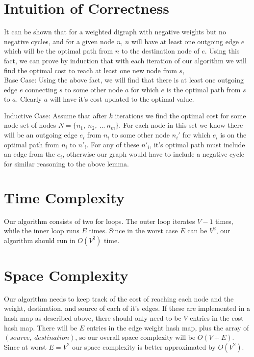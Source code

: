 \documentclass{article}
\begin{document}
\section{Intuition of Correctness}

It can be shown that for a weighted digraph with negative weights but no negative cycles, and for a given node $n$, $n$ will have at least one outgoing edge $e$ which will be the optimal path from $n$ to the destination node of $e$. Using this fact, we can prove by induction that with each iteration of our algorithm we will find the optimal cost to reach at least one new node from $s$, \\

Base Case: Using the above fact, we will find that there is at least one outgoing edge $e$ connecting $s$ to some other node $a$ for which $e$ is the optimal path from $s$ to $a$. Clearly $a$ will have it's cost updated to the optimal value.

Inductive Case: Assume that after $k$ iterations we find the optimal cost for some node set of nodes $N = \{n_1,\ n_2,\ ...\ n_m\}$. For each node in this set we know there will be an outgoing edge $e_i$ from $n_i$ to some other node $n_i'$ for which $e_i$ is on the optimal path from $n_i$ to $n'_i$. For any of these $n'_i$, it's optimal path must include an edge from the $e_i$, otherwise our graph would have to include a negative cycle for similar reasoning to the above lemma.

\section{Time Complexity}
Our algorithm consists of two for loops. The outer loop iterates $V-1$ times, while the inner loop runs $E$ times. Since in the worst case $E$ can be $V^2$, our algorithm should run in $O(V^3)$ time.

\section{Space Complexity}
Our algorithm needs to keep track of the cost of reaching each node and the weight, destination, and source of each of it's edges. If these are implemented in a hash map as described above, there should only need to be $V$ entries in the cost hash map. There will be $E$ entries in the edge weight hash map, plus the array of $(source,\ destination)$, so our overall space complexity will be $O(V + E)$. Since at worst $E = V^2$ our space complexity is better approximated by $O(V^2)$.
\end{document}
